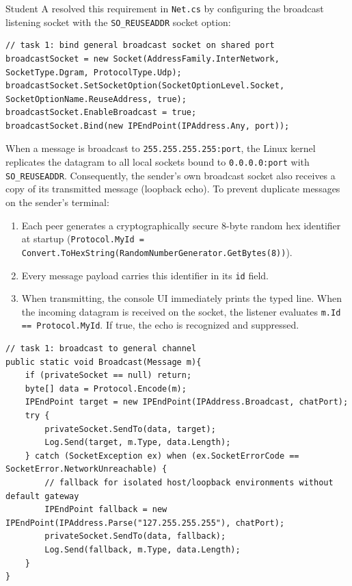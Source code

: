 \documentclass[11pt,a4paper]{article}
\begin{document}
Student A resolved this requirement in \texttt{Net.cs} by configuring the broadcast listening socket with the \texttt{SO\_REUSEADDR} socket option:
\begin{lstlisting}[language={[Sharp]C}, caption={Task 1: Shared-port binding and broadcast socket initialization in Net.cs.}]
// task 1: bind general broadcast socket on shared port
broadcastSocket = new Socket(AddressFamily.InterNetwork, SocketType.Dgram, ProtocolType.Udp);
broadcastSocket.SetSocketOption(SocketOptionLevel.Socket, SocketOptionName.ReuseAddress, true);
broadcastSocket.EnableBroadcast = true;
broadcastSocket.Bind(new IPEndPoint(IPAddress.Any, port));
\end{lstlisting}

When a message is broadcast to \texttt{255.255.255.255:port}, the Linux kernel replicates the datagram to all local sockets bound to \texttt{0.0.0.0:port} with \texttt{SO\_REUSEADDR}. Consequently, the sender's own broadcast socket also receives a copy of its transmitted message (loopback echo). To prevent duplicate messages on the sender's terminal:
\begin{enumerate}
    \item Each peer generates a cryptographically secure 8-byte random hex identifier at startup (\texttt{Protocol.MyId = Convert.ToHexString(RandomNumberGenerator.GetBytes(8))}).
    \item Every message payload carries this identifier in its \texttt{id} field.
    \item When transmitting, the console UI immediately prints the typed line. When the incoming datagram is received on the socket, the listener evaluates \texttt{m.Id == Protocol.MyId}. If true, the echo is recognized and suppressed.
\end{enumerate}

\begin{lstlisting}[language={[Sharp]C}, caption={Task 1: Echo suppression and broadcast loop in Net.cs.}]
// task 1: broadcast to general channel
public static void Broadcast(Message m){
    if (privateSocket == null) return;
    byte[] data = Protocol.Encode(m);
    IPEndPoint target = new IPEndPoint(IPAddress.Broadcast, chatPort);
    try {
        privateSocket.SendTo(data, target);
        Log.Send(target, m.Type, data.Length);
    } catch (SocketException ex) when (ex.SocketErrorCode == SocketError.NetworkUnreachable) {
        // fallback for isolated host/loopback environments without default gateway
        IPEndPoint fallback = new IPEndPoint(IPAddress.Parse("127.255.255.255"), chatPort);
        privateSocket.SendTo(data, fallback);
        Log.Send(fallback, m.Type, data.Length);
    }
}
\end{lstlisting}
\end{document}
